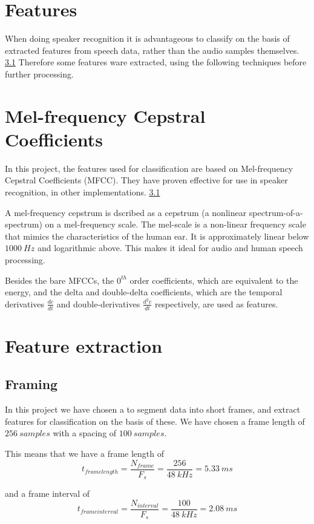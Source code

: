\section{Features}

When doing speaker recognition it is advantageous to classify on the basis of extracted features from speech data, rather than the audio samples themselves. \ref{} %
Therefore some features ware extracted, using the following techniques before further processing.

\section{Mel-frequency Cepstral Coefficients}
In this project, the features used for classification are based on Mel-frequency Cepstral Coefficients (MFCC).
They have proven effective for use in speaker recognition, in other implementations. \ref{} %

A mel-frequency cepstrum is dscribed as a cepstrum (a nonlinear spectrum-of-a-spectrum) on a mel-frequency scale.
The mel-scale is a non-linear frequency scale that mimics the characteristics of the human ear.
It is approximately linear below $ 1000\ Hz $ and logarithmic above.
This makes it ideal for audio and human speech processing.

Besides the bare MFCCs, the $ 0^{th} $ order coefficients, which are equivalent to the energy, and the delta and double-delta coefficients, which are the temporal derivatives $ \frac{dc}{dt} $ and double-derivatives $\frac{d^2c}{dt}$ respectively, are used as features.


\section{Feature extraction}
\subsection{Framing}
In this project we have chosen a to segment data into short frames, and extract features for classification on the basis of these.
We have chosen a frame length of $ 256\ samples $ with a spacing of $ 100\ samples $.

This means that we have a frame length of
\begin{equation}
t_{frame length} = \dfrac{N_{frame}}{F_s} = \dfrac{256}{48\ kHz} = 5.33\ ms
\end{equation}

and a frame interval of
\begin{equation}
t_{frame interval} = \dfrac{N_{interval}}{F_s} = \dfrac{100}{48\ kHz} = 2.08\ ms
\end{equation}


